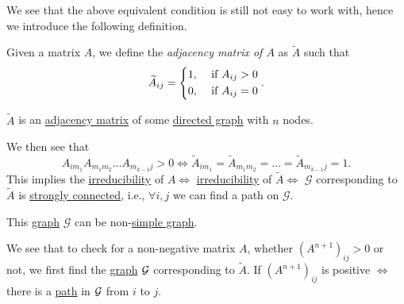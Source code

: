We see that the above equivalent condition is still not easy to work with, hence we introduce the following definition.

\begin{definition}\label{def:adjacency-matrix-of-a-matrix}
	Given a matrix \(A\), we define the \emph{adjacency matrix of \(A\)} as \(\widetilde{A} \) such that
	\[
		\widetilde{A}_{ij} = \begin{dcases}
			1, & \text{ if }A_{ij}>0 \\
			0, & \text{ if }A_{ij}=0 \\
		\end{dcases}.
	\]
\end{definition}

\begin{note}
	\(\widetilde{A} \) is an \hyperref[def:adjacency-matrix]{adjacency matrix} of some \hyperref[def:directed-graph]{directed graph} with \(n\) nodes.
\end{note}

We then see that
\[
	A_{im_1} A_{m_1 m_2}\ldots A_{m_{k-1} j} > 0 \iff \widetilde{A}_{im_1} = \widetilde{A}_{m_1 m_2} = \ldots = \widetilde{A}_{m_{k-1}j} = 1.
\]
This implies the \hyperref[def:irreducible]{irreducibility} of \(A \iff\) \hyperref[def:irreducible]{irreducibility} of \(\widetilde{A}\iff\) \(\mathcal{G}\)
corresponding to \(\widetilde{A}\) is \hyperref[def:strongly-connected]{strongly connected}, i.e., \(\forall  i, j\) we can find a path on \(\mathcal{G}\).
\begin{remark}
	This \hyperref[def:graph]{graph} \(\mathcal{G}\) can be non-\hyperref[def:simple-graph]{simple graph}.
\end{remark}

We see that to check for a non-negative matrix \(A\), whether \((A^{n+1})_{ij} > 0\) or not, we first
find the \hyperref[def:graph]{graph} \(\mathcal{\MakeUppercase{g}} \) corresponding to \(\widetilde{A}\).
If \((A^{n+1})_{ij}\) is positive \(\iff\) there is a \hyperref[def:path]{path} in \(\mathcal{\MakeUppercase{g}}\) from \(i\) to \(j\).